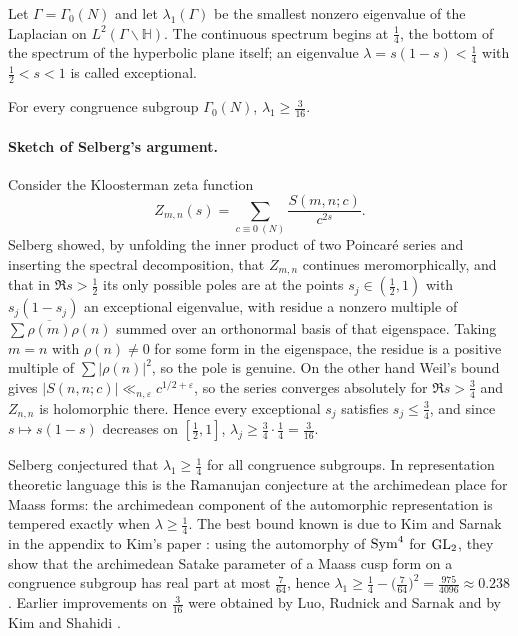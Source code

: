 Let $\Gamma=\Gamma_0(N)$ and let $\lambda_1(\Gamma)$ be the smallest nonzero eigenvalue of the Laplacian on $L^2(\Gamma\backslash\mathbb{H})$. The continuous spectrum begins at $\frac14$, the bottom of the spectrum of the hyperbolic plane itself; an eigenvalue $\lambda=s(1-s)<\frac14$ with $\frac12<s<1$ is called exceptional.

\begin{theorem}\label{thm:06bselberg}
For every congruence subgroup $\Gamma_0(N)$, $\lambda_1\ge\frac{3}{16}$.
\end{theorem}

\paragraph{Sketch of Selberg's argument.} Consider the Kloosterman zeta function
\[
Z_{m,n}(s)=\sum_{c\equiv0\ (N)}\frac{S(m,n;c)}{c^{2s}} .
\]
Selberg showed, by unfolding the inner product of two Poincar\'e series and inserting the spectral decomposition, that $Z_{m,n}$ continues meromorphically, and that in $\Re s>\frac12$ its only possible poles are at the points $s_j\in(\frac12,1)$ with $s_j(1-s_j)$ an exceptional eigenvalue, with residue a nonzero multiple of $\sum\overline{\rho(m)}\rho(n)$ summed over an orthonormal basis of that eigenspace. Taking $m=n$ with $\rho(n)\ne0$ for some form in the eigenspace, the residue is a positive multiple of $\sum|\rho(n)|^2$, so the pole is genuine. On the other hand Weil's bound gives $|S(n,n;c)|\ll_{n,\varepsilon} c^{1/2+\varepsilon}$, so the series converges absolutely for $\Re s>\frac34$ and $Z_{n,n}$ is holomorphic there. Hence every exceptional $s_j$ satisfies $s_j\le\frac34$, and since $s\mapsto s(1-s)$ decreases on $[\frac12,1]$, $\lambda_j\ge\frac34\cdot\frac14=\frac3{16}$.

Selberg conjectured that $\lambda_1\ge\frac14$ for all congruence subgroups. In representation theoretic language this is the Ramanujan conjecture at the archimedean place for Maass forms: the archimedean component of the automorphic representation is tempered exactly when $\lambda\ge\frac14$. The best bound known is due to Kim and Sarnak in the appendix to Kim's paper \cite{kimsarnak2003}: using the automorphy of $\operatorname{Sym}^4$ for $\mathrm{GL}_2$, they show that the archimedean Satake parameter of a Maass cusp form on a congruence subgroup has real part at most $\frac7{64}$, hence $\lambda_1\ge\frac14-\bigl(\frac{7}{64}\bigr)^2=\frac{975}{4096}\approx0.238$. Earlier improvements on $\frac3{16}$ were obtained by Luo, Rudnick and Sarnak \cite{lrs1995} and by Kim and Shahidi \cite{kimshahidi2002}.

